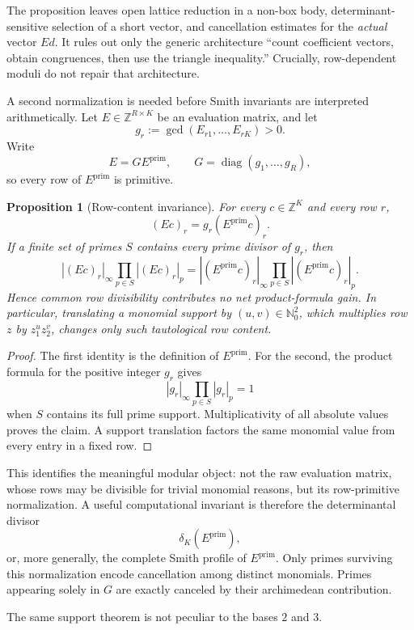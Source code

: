 \documentclass[11pt,oneside]{article}
\newtheorem{proposition}[theorem]{Proposition}
\theoremstyle{definition}
\theoremstyle{remark}
\newcommand{\Nzero}{\mathbb N_0}
\newcommand{\Z}{\mathbb Z}
\begin{document}
The proposition leaves open lattice reduction in a non-box body, determinant-sensitive
selection of a short vector, and cancellation estimates for the \emph{actual} vector $Ed$.
It rules out only the generic architecture ``count coefficient vectors, obtain congruences,
then use the triangle inequality.''  Crucially, row-dependent moduli do not repair that
architecture.

A second normalization is needed before Smith invariants are interpreted arithmetically.
Let $E\in\Z^{R\times K}$ be an evaluation matrix, and let
\[
  g_r:=\gcd(E_{r1},\dots,E_{rK})>0.
\]
Write
\[
  E=G E^{\mathrm{prim}},
  \qquad
  G=\operatorname{diag}(g_1,\dots,g_R),
\]
so every row of $E^{\mathrm{prim}}$ is primitive.

\begin{proposition}[Row-content invariance]
\label{prop:row-content-invariance}
For every $c\in\Z^K$ and every row $r$,
\[
  (Ec)_r=g_r(E^{\mathrm{prim}}c)_r.
\]
If a finite set of primes $S$ contains every prime divisor of $g_r$, then
\[
 |(Ec)_r|_\infty\prod_{p\in S}|(Ec)_r|_p
 =|(E^{\mathrm{prim}}c)_r|_\infty
   \prod_{p\in S}|(E^{\mathrm{prim}}c)_r|_p.
\]
Hence common row divisibility contributes no net product-formula gain.  In particular,
translating a monomial support by $(u,v)\in\Nzero^2$, which multiplies row $z$ by
$z_1^uz_2^v$, changes only such tautological row content.
\end{proposition}

\begin{proof}
The first identity is the definition of $E^{\mathrm{prim}}$.  For the second, the product
formula for the positive integer $g_r$ gives
\[
  |g_r|_\infty\prod_{p\in S}|g_r|_p=1
\]
when $S$ contains its full prime support.  Multiplicativity of all absolute values proves the
claim.  A support translation factors the same monomial value from every entry in a fixed
row.
\end{proof}

This identifies the meaningful modular object: not the raw evaluation matrix, whose rows may
be divisible for trivial monomial reasons, but its row-primitive normalization.  A useful
computational invariant is therefore the determinantal divisor
\[
  \delta_K(E^{\mathrm{prim}}),
\]
or, more generally, the complete Smith profile of $E^{\mathrm{prim}}$.  Only primes surviving
this normalization encode cancellation among distinct monomials.  Primes appearing solely in
$G$ are exactly canceled by their archimedean contribution.

The same support theorem is not peculiar to the bases $2$ and $3$.
\end{document}

